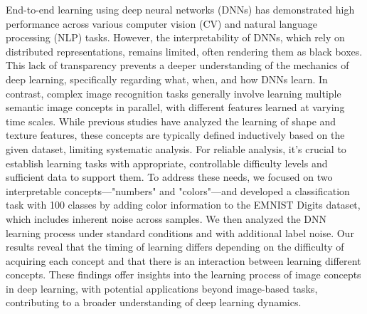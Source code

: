 End-to-end learning using deep neural networks (DNNs) has demonstrated high performance across various computer vision (CV) and natural language processing (NLP) tasks. However, the interpretability of DNNs, which rely on distributed representations, remains limited, often rendering them as black boxes. This lack of transparency prevents a deeper understanding of the mechanics of deep learning, specifically regarding what, when, and how DNNs learn.
In contrast, complex image recognition tasks generally involve learning multiple semantic image concepts in parallel, with different features learned at varying time scales. While previous studies have analyzed the learning of shape and texture features, these concepts are typically defined inductively based on the given dataset, limiting systematic analysis.
For reliable analysis, it's crucial to establish learning tasks with appropriate, controllable difficulty levels and sufficient data to support them. To address these needs, we focused on two interpretable concepts—"numbers" and "colors"—and developed a classification task with 100 classes by adding color information to the EMNIST Digits dataset, which includes inherent noise across samples. We then analyzed the DNN learning process under standard conditions and with additional label noise.
Our results reveal that the timing of learning differs depending on the difficulty of acquiring each concept and that there is an interaction between learning different concepts. These findings offer insights into the learning process of image concepts in deep learning, with potential applications beyond image-based tasks, contributing to a broader understanding of deep learning dynamics.

\newpage
